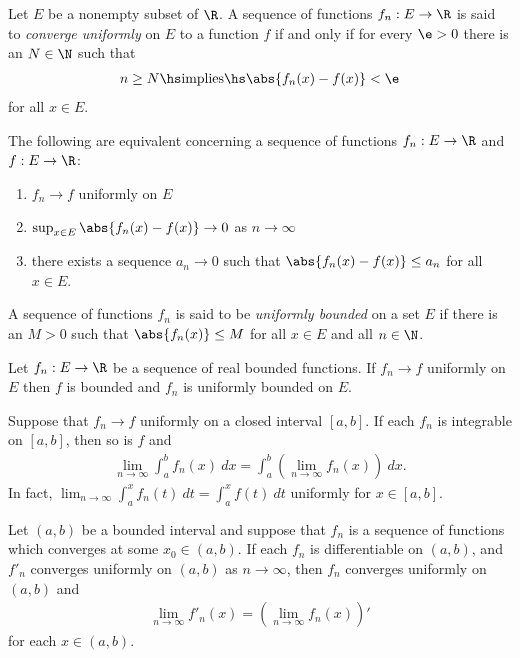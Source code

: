 \documentclass{article}
\begin{document}
\begin{definition}
	Let $E$ be a nonempty subset of $\R$. A sequence of functions $f_n:E\to\R$ is said to
	\emph{converge uniformly} on $E$ to a function $f$ if and only if for every $\e>0$ there
	is an $N\in\N$ such that
	\begin{align*}
		n\geq N\hs\text{implies}\hs \abs{f_n(x)-f(x)}<\e
	\end{align*}
	for all $x\in E$.
\end{definition}

\begin{proposition}
	The following are equivalent concerning a sequence of functions $f_n:E\to\R$ and $f:E\to\R$:
	\begin{enumerate}
		\item $f_n\to f$ uniformly on $E$
		\item $\sup_{x\in E}\abs{f_n(x)-f(x)}\to 0$ as $n\to\infty$
		\item there exists a sequence $a_n\to 0$ such that $\abs{f_n(x)-f(x)}\leq a_n$ for all $x\in E$.
	\end{enumerate}
\end{proposition}

\begin{definition}
	A sequence of functions $f_n$ is said to be \emph{uniformly bounded} on a set $E$ if there
	is an $M>0$ such that $\abs{f_n(x)}\leq M$ for all $x\in E$ and all $n\in\N$.
\end{definition}

\begin{lemma}
	Let $f_n:E\to\R$ be a sequence of real bounded functions. If $f_n\to f$ uniformly on $E$
	then $f$ is bounded and $f_n$ is uniformly bounded on $E$.
\end{lemma}

\begin{theorem}[Notes 2.2]
	Suppose that $f_n\to f$ uniformly on a closed interval $[a,b]$. If each $f_n$ is integrable
	on $[a,b]$, then so is $f$ and
	\begin{align*}
		\lim_{n\to\infty} \int_a^b f_n(x)\:dx = \int_a^b\left(\lim_{n\to\infty}f_n(x)\right)\:dx.
	\end{align*}
	In fact, $\lim_{n\to\infty} \int_a^x f_n(t)\:dt = \int_a^x f(t)\:dt$ uniformly for $x\in[a,b]$.
\end{theorem}

\begin{theorem}[Notes 2.3]
	Let $(a,b)$ be a bounded interval and suppose that $f_n$ is a sequence of functions which converges
	at some $x_0\in(a,b)$. If each $f_n$ is differentiable on $(a,b)$, and $f'_n$ converges uniformly
	on $(a,b)$ as $n\to\infty$, then $f_n$ converges uniformly on $(a,b)$ and
	\begin{align*}
		\lim_{n\to\infty}f'_n(x)= \left(\lim_{n\to\infty}f_n(x)\right)'
	\end{align*}
	for each $x\in(a,b)$.
\end{theorem}
\end{document}
